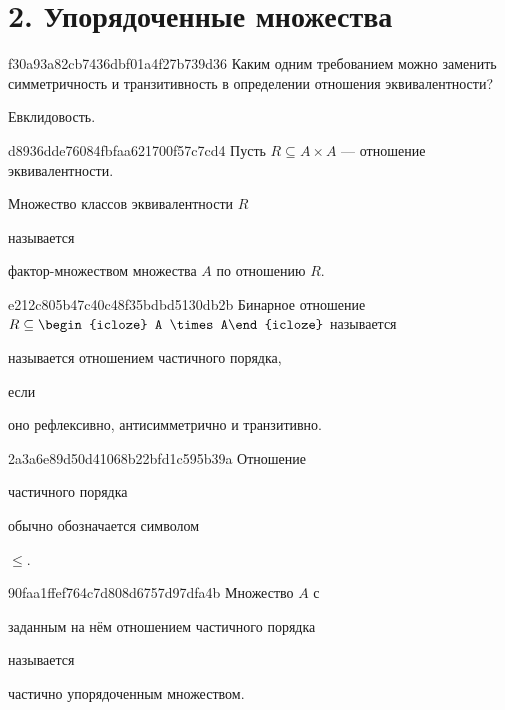 


\section{2. Упорядоченные множества}
\begin{note}{f30a93a82cb7436dbf01a4f27b739d36}
    Каким одним требованием можно заменить симметричность и транзитивность в определении отношения эквивалентности?

    \begin{cloze}{1}
        Евклидовость.
    \end{cloze}
\end{note}

\begin{note}{d8936dde76084fbfaa621700f57c7cd4}
    Пусть \({ R \subseteq A \times A }\) --- отношение эквивалентности.
    \begin{icloze}{2}Множество классов эквивалентности \({ R }\)\end{icloze} называется \begin{icloze}{1}фактор-множеством множества \({ A }\) по отношению \({ R }\).\end{icloze}
\end{note}

\begin{note}{e212c805b47c40c48f35bdbd5130db2b}
    Бинарное отношение \({ R \subseteq \begin{icloze}{3}A \times A\end{icloze} }\) называется \begin{icloze}{2}называется отношением частичного порядка,\end{icloze} если \begin{icloze}{1}оно рефлексивно, антисимметрично и транзитивно.\end{icloze}
\end{note}

\begin{note}{2a3a6e89d50d41068b22bfd1c595b39a}
    Отношение \begin{icloze}{2}частичного порядка\end{icloze} обычно обозначается символом \begin{icloze}{1}\({ \leqslant }\).\end{icloze}
\end{note}

\begin{note}{90faa1ffef764c7d808d6757d97dfa4b}
    Множество \({ A }\) с \begin{icloze}{2}заданным на нём отношением частичного порядка\end{icloze} называется \begin{icloze}{1}частично упорядоченным множеством.\end{icloze}
\end{note}

